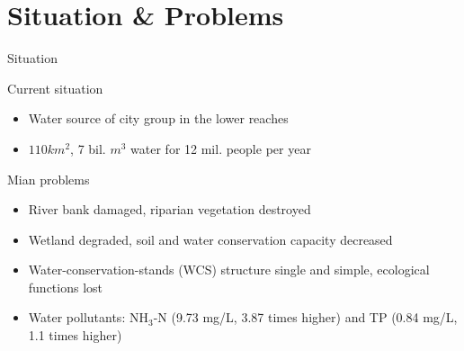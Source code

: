 \section{Situation \& Problems}

\begin{frame}{Situation}
  \begin{block}{Current situation}
    \begin{itemize}
		\item Water source of city group in the lower reaches
		\item $110 km^2$, 7 bil. $m^3$ water for 12 mil. people per year
                \end{itemize}
              \end{block}
              \begin{alertblock}{Mian problems}
                \begin{itemize}
                  \item River bank damaged, riparian vegetation destroyed
\item Wetland degraded, soil and water conservation capacity decreased
\item Water-conservation-stands (WCS) structure single and simple, ecological functions lost
\item Water pollutants: NH$_3$-N (9.73 mg/L, 3.87 times higher) and TP (0.84 mg/L, 1.1 times higher)
\end{itemize}
\end{alertblock}
 \end{frame}